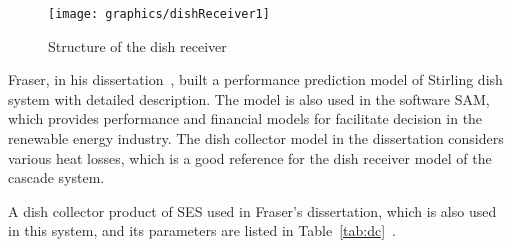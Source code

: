 \documentclass{article}
\begin{document}
\noindent \begin{figure}[htbp]
\begin{center}
	\texttt{[image: graphics/dishReceiver1]}
	\caption{Structure of the dish receiver}
	\label{fig:dishReceiver}
\end{center}
\end{figure}

Fraser, in his dissertation~\cite{Fraser2008}, built a performance prediction model of Stirling dish system with detailed description. The model is also used in the software SAM, which provides performance and financial models for facilitate decision in the renewable energy industry. The dish collector model in the dissertation considers various heat losses, which is a good reference for the dish receiver model of the cascade system. 

A dish collector product of SES used in Fraser's dissertation, which is also used in this system, and its parameters are listed in Table~\ref{tab:dc}~\cite{Fraser2008}. 
\end{document}
